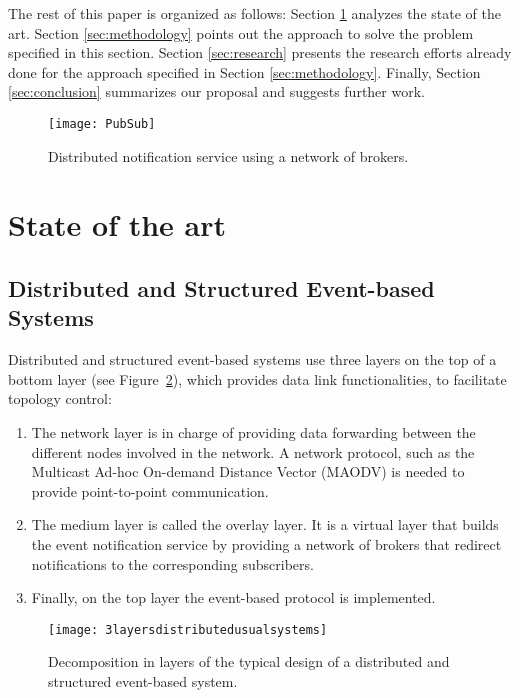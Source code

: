 \documentclass[conference]{IEEEtran}
\begin{document}
The rest of this paper is organized as follows: Section \ref{sec:state} analyzes the state of the art. Section \ref{sec:methodology} points out the approach to solve the problem specified in this section. Section \ref{sec:research} presents the research efforts already done for the approach specified in Section \ref{sec:methodology}. Finally, Section \ref{sec:conclusion} summarizes our proposal and suggests further work.

\begin{figure}[!t]
\centering
\texttt{[image: PubSub]}
\caption{Distributed notification service using a network of brokers.}
\vspace{-2.25em}
\label{PubSub}
\end{figure}


\vspace{0.2em}
\section{State of the art}
\label{sec:state}


\subsection{Distributed and Structured Event-based Systems}

Distributed and structured event-based systems use three layers on the top of a bottom layer (see Figure~\ref{3layersdistributedusualsystems}), which provides data link functionalities, to facilitate topology control:
\begin{enumerate}
\item The network layer is in charge of providing data forwarding between the different nodes involved in the network. A network protocol, such as the Multicast Ad-hoc On-demand Distance Vector (MAODV) \cite{Roy05securingmaodv:} is needed to provide point-to-point communication.
\item The medium layer is called the overlay layer. It is a virtual layer that builds the event notification service by providing a network of brokers that redirect notifications to the corresponding subscribers. 
\item Finally, on the top layer the event-based protocol is implemented.
\end{enumerate}

\begin{figure}[!h]
\centering
\texttt{[image: 3layersdistributedusualsystems]}
\caption{Decomposition in layers of the typical design of a distributed and structured event-based system.}
\vspace{-1em}
\label{3layersdistributedusualsystems}
\end{figure}
\end{document}

